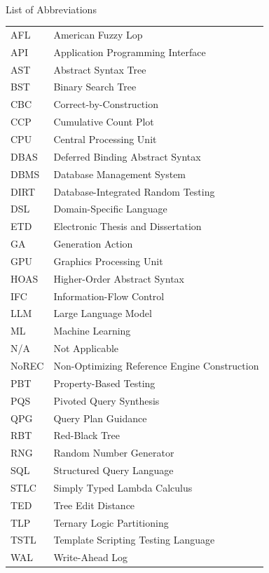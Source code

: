 
\clearpage
\renewcommand{\baselinestretch}{1}
\small\normalsize
\hbox{\ }

\vspace{-.6in}

\begin{center}
\large{List of Abbreviations}
\end{center}

\vspace{1em}

\begin{supertabular}{ll}
AFL & American Fuzzy Lop \\
API & Application Programming Interface \\
AST & Abstract Syntax Tree \\
BST & Binary Search Tree \\
CBC & Correct-by-Construction \\
CCP & Cumulative Count Plot \\
CPU & Central Processing Unit \\
DBAS & Deferred Binding Abstract Syntax \\
DBMS & Database Management System \\
DIRT & Database-Integrated Random Testing \\
DSL & Domain-Specific Language \\
ETD & Electronic Thesis and Dissertation \\
GA & Generation Action \\
GPU & Graphics Processing Unit \\
HOAS & Higher-Order Abstract Syntax \\
IFC & Information-Flow Control \\
LLM & Large Language Model \\
ML & Machine Learning \\
N/A & Not Applicable \\
NoREC & Non-Optimizing Reference Engine Construction \\
PBT & Property-Based Testing \\
PQS & Pivoted Query Synthesis \\
QPG & Query Plan Guidance \\
RBT & Red-Black Tree \\
RNG & Random Number Generator \\
SQL & Structured Query Language \\
STLC & Simply Typed Lambda Calculus \\
TED & Tree Edit Distance \\
TLP & Ternary Logic Partitioning \\
TSTL & Template Scripting Testing Language \\
WAL & Write-Ahead Log \\
\end{supertabular}
